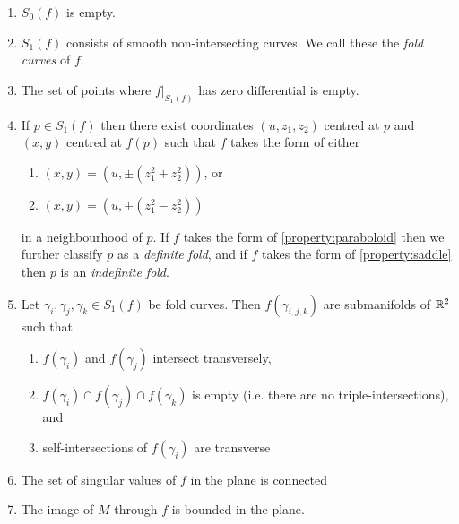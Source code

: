 \begin{enumerate}
	\item $S_0(f)$ is empty.
	
	\item $S_1(f)$ consists of smooth non-intersecting curves.  We call these the \emph{fold curves} of $f$.
	
	\item The set of points where $f|_{S_1(f)}$ has zero differential is empty.
	
	\item\label{strat-con:fold-type} If $p\in S_1(f)$ then there exist coordinates $(u, z_1, z_2)$ centred at $p$ and $(x,y)$ centred at $f(p)$ such that $f$ takes the form of either
	\begin{enumerate}
		\item\label{property:paraboloid} $(x,y)=(u,\pm(z_1^2+z_2^2))$, or
		\item\label{property:saddle} $(x,y)=(u,\pm(z_1^2-z_2^2))$
	\end{enumerate}
	in a neighbourhood of $p$.
	If $f$ takes the form of \ref{property:paraboloid} then we further classify $p$ as a \emph{definite fold}, and if $f$ takes the form of \ref{property:saddle} then $p$ is an \emph{indefinite fold}.
	
	\item Let $\gamma_i, \gamma_j, \gamma_k \in S_1(f)$ be fold curves. Then $f(\gamma_{i,j,k})$ are submanifolds of $\mathbb{R}^2$ such that
	\begin{enumerate}
		\item $f(\gamma_i)$ and $f(\gamma_j)$ intersect transversely,
		
		\item $f(\gamma_i)\cap f(\gamma_j)\cap f(\gamma_k)$ is empty (i.e. there are no triple-intersections), and
		
		\item self-intersections of $f(\gamma_i)$ are transverse
	\end{enumerate}
	
	\item The set of singular values of $f$ in the plane is connected
	
	\item The image of $M$ through $f$ is bounded in the plane.
	
\end{enumerate}

